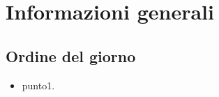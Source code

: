 \section{Informazioni generali}
    \def\modifiche { 
        {Data, YYYY-MM-DD},
        {Ora inizio, hh:mm},
        {Ora fine, hh:mm},
        {Luogo, piattaforma},
        {Presenze, \unexpanded{
            \begin{itemize}
                \item Andrea Breggion;
                \item Matteo Falsetti;
                \item Alessandro Flori;
                \item Andrea Mascari;
                \item Diego Piola;
                \item Andrea Signori;
                \item Damiano Zanardo.
            \end{itemize}}
        },
    }
    

\subsection{Ordine del giorno}
\begin{itemize}
    \item punto1.
\end{itemize}